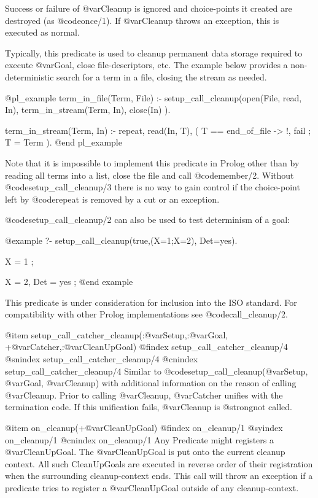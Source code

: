 Success or failure of @var{Cleanup} is ignored and choice-points it
created are destroyed (as @code{once/1}). If @var{Cleanup} throws an exception,
this is executed as normal.

Typically, this predicate is used to cleanup permanent data storage
required to execute @var{Goal}, close file-descriptors, etc. The example
below provides a non-deterministic search for a term in a file, closing
the stream as needed.

@pl_example
term_in_file(Term, File) :-
    setup_call_cleanup(open(File, read, In),
               term_in_stream(Term, In),
               close(In) ).

term_in_stream(Term, In) :-
    repeat,
    read(In, T),
    (   T == end_of_file
    ->  !, fail
    ;   T = Term
    ).
@end pl_example

Note that it is impossible to implement this predicate in Prolog other than
by reading all terms into a list, close the file and call @code{member/2}.
Without @code{setup_call_cleanup/3} there is no way to gain control if the
choice-point left by @code{repeat} is removed by a cut or an exception.

@code{setup_call_cleanup/2} can also be used to test determinism of a goal:

@example
?- setup_call_cleanup(true,(X=1;X=2), Det=yes).

X = 1 ;

X = 2,
Det = yes ;
@end example

This predicate is under consideration for inclusion into the ISO standard.
For compatibility with other Prolog implementations see @code{call_cleanup/2}.

 @item setup_call_catcher_cleanup(:@var{Setup},:@var{Goal}, +@var{Catcher},:@var{CleanUpGoal})
@findex setup_call_catcher_cleanup/4
@snindex setup_call_catcher_cleanup/4
@cnindex setup_call_catcher_cleanup/4
Similar to @code{setup_call_cleanup(@var{Setup}, @var{Goal}, @var{Cleanup})} with
additional information on the reason of calling @var{Cleanup}.  Prior
to calling @var{Cleanup}, @var{Catcher} unifies with the termination
code.  If this unification fails, @var{Cleanup} is
@strong{not} called.


@item on_cleanup(+@var{CleanUpGoal})
@findex on_cleanup/1
@syindex on_cleanup/1
@cnindex on_cleanup/1
Any Predicate might registers a @var{CleanUpGoal}. The
@var{CleanUpGoal} is put onto the current cleanup context. All such
CleanUpGoals are executed in reverse order of their registration when
the surrounding cleanup-context ends. This call will throw an exception
if a predicate tries to register a @var{CleanUpGoal} outside of any
cleanup-context.

